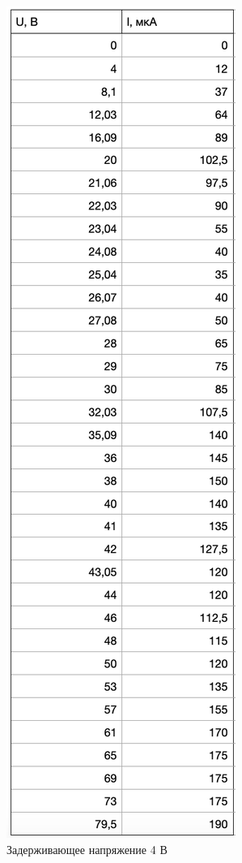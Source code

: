 \documentclass[a4paper]{article}
\begin{document}
\begin{enumerate}
\begin{figure}[H]
\begin{center}
\begin{minipage}[h]{0.3\linewidth}
	\caption{Задерживающее напряжение 4 В} 
	\label{t1}
	\end{minipage}
	\hfill 
	\begin{minipage}[h]{0.3\linewidth}
	\includegraphics[width=1\linewidth]{t2.png}

\end{minipage}
\end{center}
\end{figure}
\end{enumerate}
\end{document}
